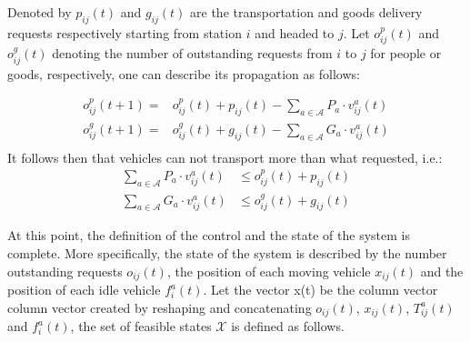 Denoted by $p_{ij}(t)$ and $g_{ij}(t)$ are the transportation and goods delivery requests respectively starting from station $i$ and headed to $j$. Let $o^p_{ij}(t)$ and $o^g_{ij}(t)$ denoting the number of outstanding requests from $i$ to $j$ for people or goods, respectively, one can describe its propagation as follows:

\begin{equation}
	\begin{aligned}
		o^p_{ij}(t+1) =& o^p_{ij}(t) + p_{ij}(t) - \sum_{a \in \mathcal{A}} P_a\cdot v^a_{ij}(t)\\
			o^g_{ij}(t+1) =& o^g_{ij}(t) + g_{ij}(t) - \sum_{a \in \mathcal{A}} G_a \cdot v^a_{ij}(t)\\
	\end{aligned}
	\label{eq:demand_time}
\end{equation}
It follows then that vehicles can not transport more than what requested, i.e.:
\begin{equation}
	\begin{aligned}
	\sum_{a \in \mathcal{A}}  P_a\cdot v^a_{ij}(t) &\leq o^p_{ij}(t) + p_{ij}(t) \\
	\sum_{a \in \mathcal{A}} G_a \cdot v^a_{ij}(t) &\leq o^g_{ij}(t) + g_{ij}(t)
	\end{aligned}
	 \label{eq:no_more_than_request}
\end{equation}


At this point, the definition of the control and the state of the system is complete. More specifically, the state of the system is described by the number outstanding requests $o_{ij}(t)$, the position of each moving vehicle $x_{ij}(t)$ and the position of each idle vehicle $f^a_{i}(t)$. Let the vector x(t) be the column vector column vector created by reshaping and concatenating $o_{ij}(t)$, $x_{ij}(t)$, $T_{ij}^a(t)$ and $f^a_{i}(t)$, the set of feasible states $\mathcal{X}$ is defined as follows. 

